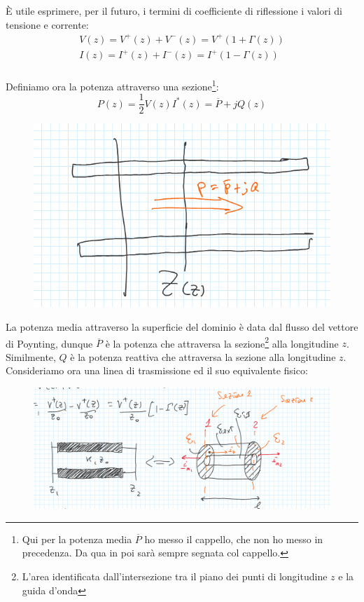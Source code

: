 \documentclass{book}
\begin{document}
        È utile esprimere, per il futuro, i termini di coefficiente di riflessione i valori di
        tensione e corrente:
        \begin{align}
            \label{eqn:eq_VI_Gamma}
            V(z)=V^{+}(z)+V^{-}(z)=V^{+}(1+\Gamma (z))  \\
            I(z)=I^{+}(z)+I^{-}(z)=I^{+}(1-\Gamma (z))
        \end{align}
        \\ Definiamo ora la potenza attraverso una sezione\footnote{Qui per la potenza media $\overline{P}$ ho messo il cappello, che non ho messo in precedenza. Da qua in poi sarà sempre segnata col cappello.}:
        \begin{equation}
            P(z)=\frac{1}{2}V(z)I^{*}(z) = \overline{P}+jQ(z)
        \end{equation}
        \begin{figure}[h!]
            \center  
            \includegraphics[width=0.75\linewidth]{Chapter_two/Chapt2img5.png}
        \end{figure}
        La potenza media attraverso la superficie del dominio è data dal flusso del vettore di Poynting, dunque $\overline{P}$ è 
        la potenza che attraversa la sezione\footnote{L'area identificata dall'intersezione tra il piano dei punti di longitudine $z$ e la guida d'onda} alla longitudine $z$. Similmente, $Q$ è la potenza reattiva che attraversa la sezione alla longitudine $z$.
         \newpage
        Consideriamo ora una linea di trasmissione ed il suo equivalente fisico:
        \begin{figure}
            \center 
            \includegraphics[width=0.75\linewidth]{Chapter_two/Chapt2img7.png}
        \end{figure}
\end{document}
